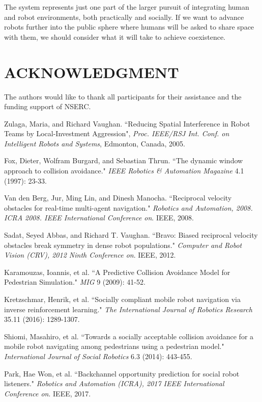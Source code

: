 \documentclass[letterpaper, 10 pt, conference]{ieeeconf}  %
\begin{document}
The system represents just one part of the larger pursuit of integrating human and robot environments, both practically and socially. If we want to advance robots further into the public sphere where humans will be asked to share space with them, we should consider what it will take to achieve coexistence.

\section*{ACKNOWLEDGMENT}

The authors would like to thank all participants for their assistance and the funding support of NSERC.

\begin{thebibliography}{99}

 Zulaga, Maria, and Richard Vaughan. ``Reducing Spatial Interference in Robot Teams by Local-Investment Aggression", \textit{Proc. IEEE/RSJ Int. Conf. on Intelligent Robots and Systems}, Edmonton, Canada, 2005.

 Fox, Dieter, Wolfram Burgard, and Sebastian Thrun. ``The dynamic window approach to collision avoidance." \textit{IEEE Robotics & Automation Magazine} 4.1 (1997): 23-33.

 Van den Berg, Jur, Ming Lin, and Dinesh Manocha. ``Reciprocal velocity obstacles for real-time multi-agent navigation." \textit{Robotics and Automation, 2008. ICRA 2008. IEEE International Conference on}. IEEE, 2008.

 Sadat, Seyed Abbas, and Richard T. Vaughan. ``Bravo: Biased reciprocal velocity obstacles break symmetry in dense robot populations." \textit{Computer and Robot Vision (CRV), 2012 Ninth Conference on}. IEEE, 2012.

 Karamouzas, Ioannis, et al. ``A Predictive Collision Avoidance Model for Pedestrian Simulation." \textit{MIG} 9 (2009): 41-52.

 Kretzschmar, Henrik, et al. ``Socially compliant mobile robot navigation via inverse reinforcement learning." \textit{The International Journal of Robotics Research} 35.11 (2016): 1289-1307.

 Shiomi, Masahiro, et al. ``Towards a socially acceptable collision avoidance for a mobile robot navigating among pedestrians using a pedestrian model." \textit{International Journal of Social Robotics} 6.3 (2014): 443-455.

 Park, Hae Won, et al. ``Backchannel opportunity prediction for social robot listeners." \textit{Robotics and Automation (ICRA), 2017 IEEE International Conference on}. IEEE, 2017.


\end{thebibliography}
\end{document}
